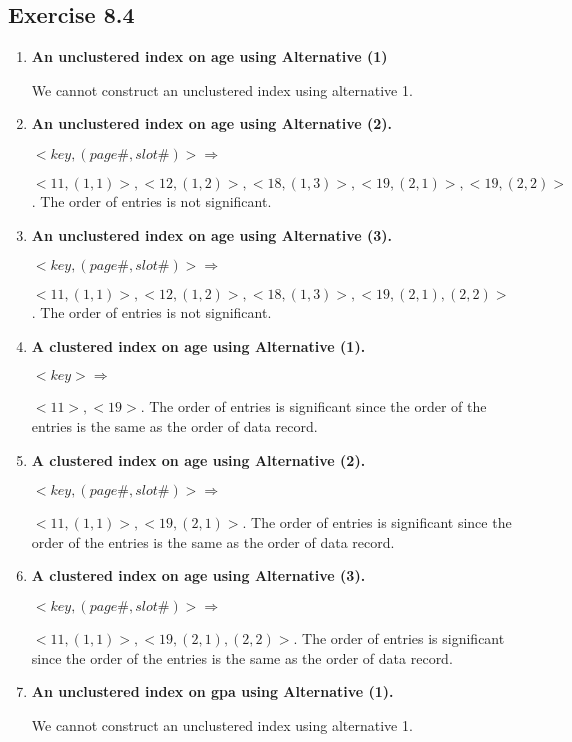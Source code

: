\subsection{Exercise 8.4}
\begin{enumerate}
\item {\bf An unclustered index on age using Alternative (1)}

We cannot construct an unclustered index using alternative 1.

\item {\bf An unclustered index on age using Alternative (2).}

$<key, (page \#, slot \#)> \Rightarrow$

$<11, (1, 1)>, <12, (1, 2)>, <18, (1, 3)>, <19, (2, 1)>, <19, (2, 2)>$. The order of entries is not significant.

\item {\bf An unclustered index on age using Alternative (3).}

$<key, (page \#, slot \#)> \Rightarrow$

$<11, (1, 1)>, <12, (1, 2)>, <18, (1, 3)>, <19, (2, 1), (2, 2)>$.  The order of entries is not significant.

\item {\bf A clustered index on age using Alternative (1).}

$<key> \Rightarrow$

$<11>, <19>$.  The order of entries is significant since the order of the entries is the same as the order of data record.

\item {\bf A clustered index on age using Alternative (2).}

$<key, (page \#, slot \#)> \Rightarrow$

$<11, (1, 1)>, <19, (2, 1)>$.  The order of entries is significant since the order of the entries is the same as the order of data record.

\item {\bf A clustered index on age using Alternative (3).}

$<key, (page \#, slot \#)> \Rightarrow$

$<11, (1, 1)>, <19, (2, 1), (2, 2)>$.  The order of entries is significant since the order of the entries is the same as the order of data record.

\item {\bf An unclustered index on gpa using Alternative (1). }

We cannot construct an unclustered index using alternative 1.


\end{enumerate}
